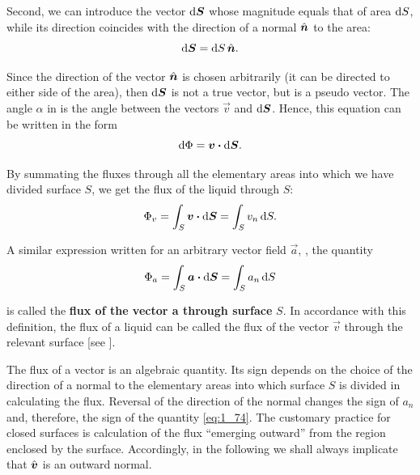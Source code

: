 \noindent
Second, we can introduce the vector $\mathrm{d}\boldsymbol{S}$ whose magnitude equals that of area $\mathrm{d} S$, while its direction coincides with the direction of a normal $\hat{\boldsymbol{n}}$ to the area:
\begin{equation*}
	\mathrm{d}\boldsymbol{S} = \mathrm{d} S\, \hat{\boldsymbol{n}}.
\end{equation*}

\noindent
Since the direction of the vector $\hat{\boldsymbol{n}}$ is chosen arbitrarily (it can be directed to either side of the area), then $\mathrm{d}\boldsymbol{S}$ is not a true vector, but is a pseudo vector. The angle $\alpha$ in  is the angle between the vectors $\vec{v}$ and $\mathrm{d}\boldsymbol{S}$. Hence, this equation can be written in the form
\begin{equation}\label{eq:1_72}
	\mathrm{d}\Phi = \boldsymbol{v} \boldsymbol{\cdot} \mathrm{d}\boldsymbol{S}.
\end{equation}

By summating the fluxes through all the elementary areas into which we have divided surface $S$, we get the flux of the liquid through $S$:
\begin{equation}\label{eq:1_73}
	\Phi_v = \int_S \boldsymbol{v} \boldsymbol{\cdot} \mathrm{d}\boldsymbol{S} = \int_S v_n\, \mathrm{d} S.
\end{equation}

\noindent
A similar expression written for an arbitrary vector field $\vec{a}$, \ie, the quantity
\begin{equation}\label{eq:1_74}
	\Phi_a = \int_S \boldsymbol{a} \boldsymbol{\cdot} \mathrm{d}\boldsymbol{S} = \int_S a_n\, \mathrm{d} S
\end{equation}

\noindent
is called the \textbf{flux of the vector a through surface} $S$. In accordance with this definition, the flux of a liquid can be called the flux of the vector $\vec{v}$ through the relevant surface [see ].

The flux of a vector is an algebraic quantity. Its sign depends on the choice of the direction of a normal to the elementary areas into which surface $S$ is divided in calculating the flux. Reversal of the direction of the normal changes the sign of $a_n$ and, therefore, the sign of the quantity \eqref{eq:1_74}. The customary practice for closed surfaces is calculation of the flux ``emerging outward'' from the region enclosed by the surface. Accordingly, in the following we shall always implicate that $\hat{\boldsymbol{v}}$ is an outward normal.

